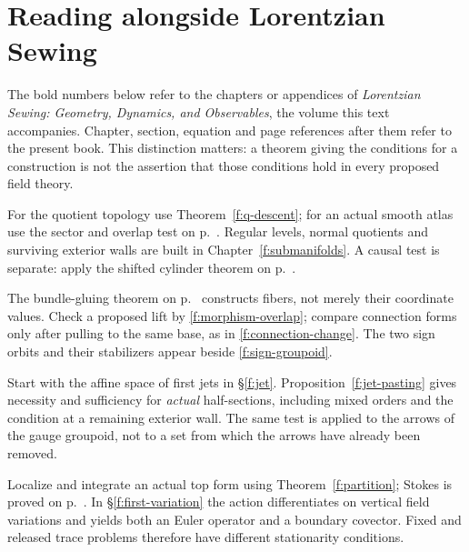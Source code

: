 \chapter*{Reading alongside Lorentzian Sewing}
The bold numbers below refer to the chapters or appendices of \emph{Lorentzian Sewing: Geometry, Dynamics, and Observables}, the volume this text accompanies. Chapter, section, equation and page references after them refer to the present book. This distinction matters: a theorem giving the conditions for a construction is not the assertion that those conditions hold in every proposed field theory.

\begin{description}[style=nextline,leftmargin=0pt,labelindent=0pt,labelwidth=0pt,labelsep=0pt,font=\normalfont\bfseries]
\item[1. Sewing spacetime regions.] For the quotient topology use Theorem~\ref{f:q-descent}; for an actual smooth atlas use the sector and overlap test on p.~\pageref{f:sector-theorem}. Regular levels, normal quotients and surviving exterior walls are built in Chapter~\ref{f:submanifolds}. A causal test is separate: apply the shifted cylinder theorem on p.~\pageref{f:shift-cylinder}.
\item[2. Bundles and connections at a cut.] The bundle-gluing theorem on p.~\pageref{f:bundle-gluing} constructs fibers, not merely their coordinate values. Check a proposed lift by \eqref{f:morphism-overlap}; compare connection forms only after pulling to the same base, as in \eqref{f:connection-change}. The two sign orbits and their stabilizers appear beside \eqref{f:sign-groupoid}.
\item[3. Smooth fields and gauge transformations.] Start with the affine space of first jets in \S\ref{f:jet}. Proposition~\ref{f:jet-pasting} gives necessity and sufficiency for \emph{actual} half-sections, including mixed orders and the condition at a remaining exterior wall. The same test is applied to the arrows of the gauge groupoid, not to a set from which the arrows have already been removed.
\item[4. Varying a region.] Localize and integrate an actual top form using Theorem~\ref{f:partition}; Stokes is proved on p.~\pageref{f:stokes}. In \S\ref{f:first-variation} the action differentiates on vertical field variations and yields both an Euler operator and a boundary covector. Fixed and released trace problems therefore have different stationarity conditions.

\end{description}
